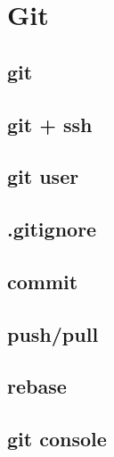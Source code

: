 \section{Git}
\subsection{git}
\subsection{git + ssh}
\subsection{git user}
\subsection{.gitignore}
\subsection{commit}
\subsection{push/pull}
\subsection{rebase}
\subsection{git console}
\newpage
